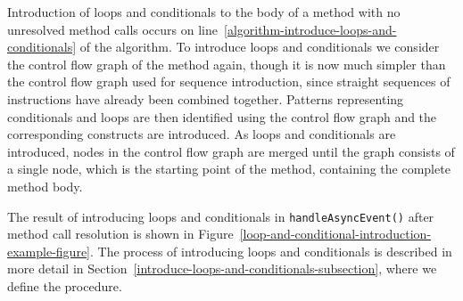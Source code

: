 Introduction of loops and conditionals to the body of a method with no
unresolved method calls occurs on
line~\ref{algorithm-introduce-loops-and-conditionals} of the
algorithm.
To introduce loops and conditionals we consider the control flow graph
of the method again, though it is now much simpler than the control
flow graph used for sequence introduction, since straight sequences of
instructions have already been combined together.
Patterns representing conditionals and loops are then identified using
the control flow graph and the corresponding constructs are
introduced.
As loops and conditionals are introduced, nodes in the control flow
graph are merged until the graph consists of a single node, which is
the starting point of the method, containing the complete method body.

The result of introducing loops and conditionals in
\texttt{handleAsyncEvent()} after method call resolution is shown in
Figure~\ref{loop-and-conditional-introduction-example-figure}.
The process of introducing loops and conditionals is described in more
detail in Section~\ref{introduce-loops-and-conditionals-subsection},
where we define the  procedure.
